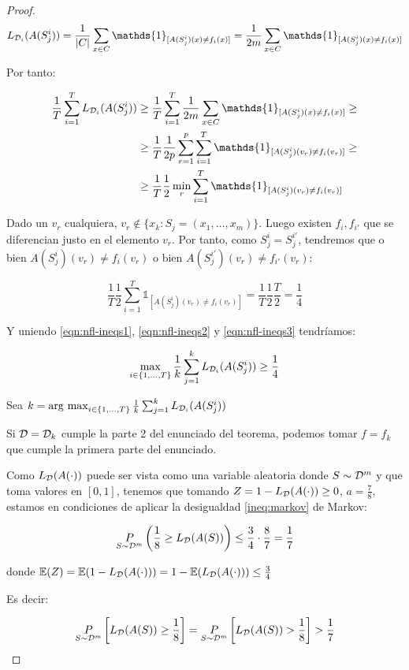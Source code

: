 \begin{proof}
\[L_{\dist_i} (A(S^i_j)) = \frac{1}{|C|} \sum_{x\in C} \mathds{1}_{[A(S^i_j)(x) \neq f_i(x)]} = 
  \frac{1}{2m} \sum_{x \in C} \mathds{1}_{[A(S^i_j)(x) \neq f_i(x)]}\]


Por tanto:

\begin{align}
\frac{1}{T} \sum_{i=1}^{T}  L_{\dist_i} (A(S_j^i)) &\ge
\frac{1}{T} \sum_{i=1}^{T}  \frac{1}{2m} \sum_{x \in C} \mathds{1}_{[A(S^i_j)(x) \neq f_i(x)]} \ge \nonumber\\
&\ge \frac{1}{T} \frac{1}{2p} \sum_{r=1}^p \sum_{i=1}^{T}  \mathds{1}_{[A(S^i_j)(v_r) \neq f_i(v_r)]} \ge \nonumber\\
&\ge \frac{1}{T} \frac{1}{2} \min_{r} \sum_{i=1}^{T}  \mathds{1}_{[A(S^i_j)(v_r) \neq f_i(v_r)]} 
\label{eqn:nfl-ineqs2}
\end{align}


Dado un $v_r$ cualquiera, $v_r \notin \bigg\{x_k: S_j = (x_1, \ldots, x_m)\bigg\}$. Luego existen 
$f_i, f_{i'}$ que se diferencian justo en el elemento $v_r$. Por tanto, como $S_j^i = S_j^{i'}$,
tendremos que o bien $A(S^i_j)(v_r) \neq f_i(v_r)$ o bien $A(S^{i'}_j)(v_r) \neq f_{i'}(v_r)$:

\begin{equation}
\frac{1}{T} \frac{1}{2} \sum_{i=1}^{T}  \mathds{1}_{[A(S^i_j)(v_r) \neq f_i(v_r)]} = 
  \frac{1}{T} \frac{1}{2} \frac{T}{2} = \frac{1}{4}
\label{eqn:nfl-ineqs3}
\end{equation}

Y uniendo \eqref{eqn:nfl-ineqs1}, \eqref{eqn:nfl-ineqs2} y \eqref{eqn:nfl-ineqs3} tendríamos:

\[\max_{i \in \{1,\ldots, T\}} \frac{1}{k} \sum_{j=1}^{k} L_{\mathcal{D}_i} (A(S_j^i)) \ge \frac{1}{4}\]

Sea $k = \operatorname*{arg\,\max}_{i \in \{1,\ldots, T\}} \frac{1}{k} \sum_{j=1}^{k} L_{\mathcal{D}_i} (A(S_j^i))$

Si $\mathcal{D} = \mathcal{D}_k$ cumple la parte 2 del enunciado del teorema, podemos tomar $f=f_k$ que cumple la primera
parte del enunciado.

Como $L_{\mathcal{D}} (A(\cdot))$ puede ser vista como una variable aleatoria donde $S \sim \mathcal{D}^m$ y que toma
valores en $[0,1]$, tenemos que tomando $Z = 1-L_{\mathcal{D}}(A(\cdot))\ge 0$, $a=\frac{7}{8}$, estamos en 
condiciones de aplicar la desigualdad \ref{ineq:markov} de Markov:

\[\underset{S\sim \mathcal{D}^m}{P} \left(\frac{1}{8} \ge L_{\mathcal{D}}(A(S)) \right) \le \frac{3}{4} \cdot \frac{8}{7} = \frac{1}{7}\]

donde $\mathbb{E}(Z) = \mathbb{E} (1 - L_{\mathcal{D}}(A(\cdot))) = 1 - \mathbb{E} (L_{\mathcal{D}}(A(\cdot))) \le \frac{3}{4}$

Es decir:

\[\underset{S\sim \mathcal{D}^m}{P} \left[ L_{\mathcal{D}}(A(S)) \ge \frac{1}{8} \right] = \underset{S\sim \mathcal{D}^m}{P} \left[ L_{\mathcal{D}}(A(S)) > \frac{1}{8} \right] > 
\frac{1}{7}\]
\end{proof}


